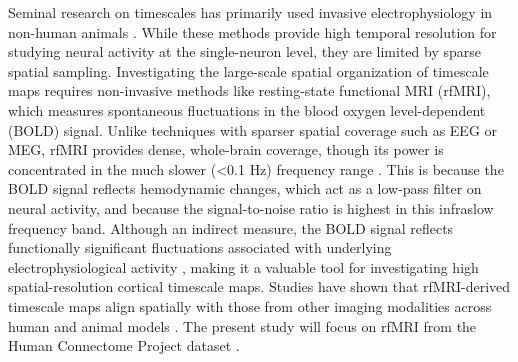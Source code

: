 \documentclass[9pt]{article}
\begin{document}
Seminal research on timescales has primarily used invasive electrophysiology in non-human animals \citep{murray_hierarchy_2014, cirillo_neural_2018, nougaret_intrinsic_2021, manea_intrinsic_2022, spitmaan_multiple_2020, trepka_training-dependent_2024}. While these methods provide high temporal resolution for studying neural activity at the single-neuron level, they are limited by sparse spatial sampling. Investigating the large-scale spatial organization of timescale maps requires non-invasive methods like resting-state functional MRI (rfMRI), which measures spontaneous fluctuations in the blood oxygen level-dependent (BOLD) signal. Unlike techniques with sparser spatial coverage such as EEG or MEG, rfMRI provides dense, whole-brain coverage, though its power is concentrated in the much slower (<0.1 Hz) frequency range \citep{raut_hierarchical_2020, he_scale-free_2011}. This is because the BOLD signal reflects hemodynamic changes, which act as a low-pass filter on neural activity, and because the signal-to-noise ratio is highest in this infraslow frequency band. Although an indirect measure, the BOLD signal reflects functionally significant fluctuations associated with underlying electrophysiological activity \citep{logothetis_what_2008}, making it a valuable tool for investigating high spatial-resolution cortical timescale maps. Studies have shown that rfMRI-derived timescale maps align spatially with those from other imaging modalities across human and animal models \citep{raut_hierarchical_2020, shafiei_topographic_2020, lurie_cortical_2024}. The present study will focus on rfMRI from the Human Connectome Project dataset \citep{van_essen_wu-minn_2013}.
\end{document}
